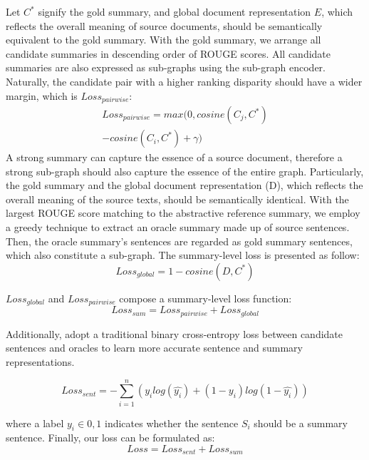 \documentclass[11pt]{article}
\begin{document}
Let $C^*$ signify the gold summary, and global document representation $E$, which reflects the overall meaning of source documents, should be semantically equivalent to the gold summary. 
With the gold summary, we arrange all candidate summaries in descending order of ROUGE scores. All candidate summaries are also expressed as sub-graphs using the sub-graph encoder. Naturally, the candidate pair with a higher ranking disparity should have a wider margin, which is $Loss_{pairwise}$:
\begin{equation}
\begin{aligned}
    Loss_{pairwise} = max(0, cosine(C_j, C^*) \\- cosine(C_i, C^*) +\gamma)
\end{aligned}
\end{equation}
A strong summary can capture the essence of a source document, therefore a strong sub-graph should also capture the essence of the entire graph. Particularly, the gold summary and the global document representation (D), which reflects the overall meaning of the source texts, should be semantically identical. With the largest ROUGE score matching to the abstractive reference summary, we employ a greedy technique to extract an oracle summary made up of source sentences. Then, the oracle summary's sentences are regarded as gold summary sentences, which also constitute a sub-graph.
The summary-level loss is presented as follow:
\begin{equation}
    Loss_{global} = 1 - cosine(D, C^*)
\end{equation}

$Loss_{global}$ and $Loss_{pairwise}$ compose a summary-level loss function: 
\begin{equation}
    Loss_{sum} = Loss_{pairwise} + Loss_{global}
\end{equation}

Additionally, \cite{chen2021sgsum} adopt a traditional binary cross-entropy loss between candidate sentences and oracles to learn more accurate sentence and summary representations.

\begin{equation}
    Loss_{sent} = - \sum^n_{i=1}(y_ilog(\hat{y_i}) + (1-y_i)log(1-\hat{y_i}))
\end{equation}

where a label $y_i \in {0, 1}$ indicates whether the
sentence $S_i$ should be a summary sentence. Finally, our loss can be formulated as:
\begin{equation}
    Loss =  Loss_{sent} + Loss_{sum}
\end{equation}
\end{document}
